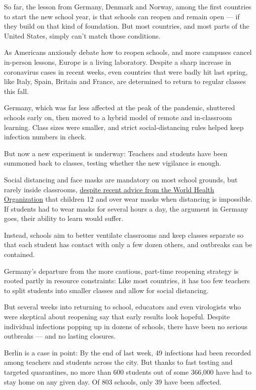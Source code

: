So far, the lesson from Germany, Denmark and Norway, among the first
countries to start the new school year, is that schools can reopen and
remain open --- if they build on that kind of foundation. But most
countries, and most parts of the United States, simply can't match those
conditions.

As Americans anxiously debate how to reopen schools, and more campuses
cancel in-person lessons, Europe is a living laboratory. Despite a sharp
increase in coronavirus cases in recent weeks, even countries that were
badly hit last spring, like Italy, Spain, Britain and France, are
determined to return to regular classes this fall.

Germany, which was far less affected at the peak of the pandemic,
shuttered schools early on, then moved to a hybrid model of remote and
in-classroom learning. Class sizes were smaller, and strict
social-distancing rules helped keep infection numbers in check.

But now a new experiment is underway: Teachers and students have been
summoned back to classes, testing whether the new vigilance is enough.

Social distancing and face masks are mandatory on most school grounds,
but rarely inside classrooms,
\href{https://www.bbc.com/news/world-53877292}{despite recent advice
from the World Health Organization} that children 12 and over wear masks
when distancing is impossible. If students had to wear masks for several
hours a day, the argument in Germany goes, their ability to learn would
suffer.

Instead, schools aim to better ventilate classrooms and keep classes
separate so that each student has contact with only a few dozen others,
and outbreaks can be contained.

Germany's departure from the more cautious, part-time reopening strategy
is rooted partly in resource constraints: Like most countries, it has
too few teachers to split students into smaller classes and allow for
social distancing.

But several weeks into returning to school, educators and even
virologists who were skeptical about reopening say that early results
look hopeful. Despite individual infections popping up in dozens of
schools, there have been no serious outbreaks --- and no lasting
closures.

Berlin is a case in point: By the end of last week, 49 infections had
been recorded among teachers and students across the city. But thanks to
fast testing and targeted quarantines, no more than 600 students out of
some 366,000 have had to stay home on any given day. Of 803 schools,
only 39 have been affected.

